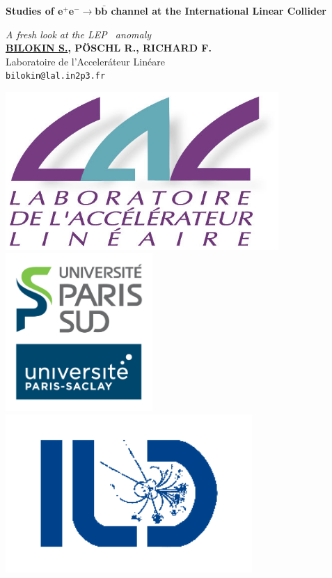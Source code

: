 \documentclass[a0,portrait]{a0poster}
\begin{document}
\BgThispage

\begin{minipage}[b]{1.\linewidth}
\veryHuge \color{NavyBlue} \textbf{Studies of $\pmb{ e^+e^-\to b\bar{b}}$ channel at the International Linear Collider} \color{Black} %
\end{minipage}
\begin{minipage}[b]{0.5\linewidth}
\Huge\textit{A fresh look at the LEP \afb\ anomaly}\\[1cm]
\huge \textbf{\underline{BILOKIN S.}, P\"OSCHL R., RICHARD F.}\\[0.5cm] %
\huge Laboratoire de l'Acceler\'ateur Lin\'eare\\[0.4cm] %
\Large \texttt{bilokin@lal.in2p3.fr}
\end{minipage}
\begin{minipage}[b]{0.5\linewidth}
	\centering
\includegraphics[height=6cm]{figures/LAL.jpg}
\includegraphics[height=6cm]{figures/UPSUD.jpg}
\includegraphics[height=6cm]{figures/logo-ild.png}\\
\end{minipage}

\vspace{1cm} %


\begin{multicols}{2} 

\end{multicols}
\end{document}
